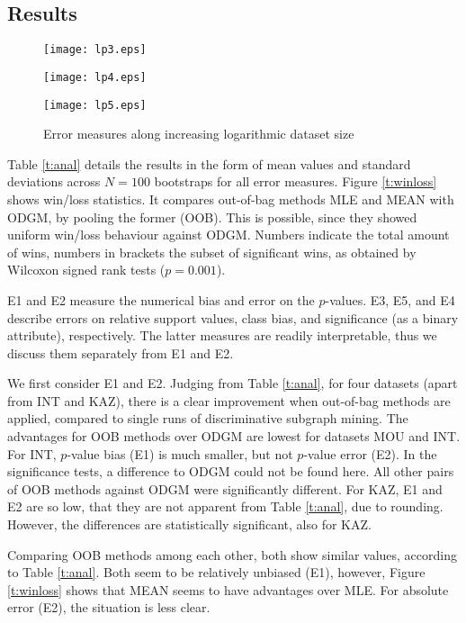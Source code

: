 \documentclass{sig-alternate}
\begin{document}
\subsection{Results}

\label{ss:Results}
\begin{figure*}[t]
  \begin{minipage}[h]{5.5cm}
    \texttt{[image: lp3.eps]}
  \end{minipage}
  \begin{minipage}[h]{5.5cm}
    \texttt{[image: lp4.eps]}
  \end{minipage}
  \begin{minipage}[h]{5.5cm}
    \texttt{[image: lp5.eps]}
  \end{minipage}
  \caption{Error measures along increasing logarithmic dataset size}
  \label{fig:lp}
\end{figure*}
Table \ref{t:anal} details the results in the form of mean values and standard
deviations across $N=100$ bootstraps for all error measures. 
Figure
\ref{t:winloss} shows win/loss statistics. It compares out-of-bag methods MLE
and MEAN with ODGM, by pooling the former (OOB). This is possible, since they
showed uniform win/loss behaviour against ODGM.
Numbers indicate the total amount of wins, numbers in brackets the
subset of significant wins, as obtained by Wilcoxon signed rank tests ($p=0.001$).

E1 and E2 measure the numerical bias and error on the $p$-values. E3, E5, and E4 describe errors on
relative support values, class bias, and significance (as a binary attribute),
respectively. The latter measures are readily interpretable, thus we discuss
them separately from E1 and E2.

We first consider E1 and E2. Judging from Table \ref{t:anal}, for four datasets
(apart from INT and KAZ), there is a clear improvement when out-of-bag
methods are applied, compared to single runs of discriminative
subgraph mining. The advantages for OOB methods over ODGM are lowest for datasets MOU and INT.
For INT, $p$-value bias (E1)
is much smaller, but not $p$-value error (E2). In the significance
tests, a difference to ODGM could not be found here. All other pairs of OOB 
methods against ODGM were significantly different. For KAZ, E1 and
E2 are so low, that they are not apparent from Table \ref{t:anal}, due to rounding. However,
the differences are statistically significant, also for KAZ.

Comparing OOB methods among each other, both show
similar values, according to Table \ref{t:anal}. Both seem to be relatively
unbiased (E1), however, Figure \ref{t:winloss} shows that MEAN seems to have
advantages over MLE. For absolute error (E2), the situation is less clear. 
\end{document}

